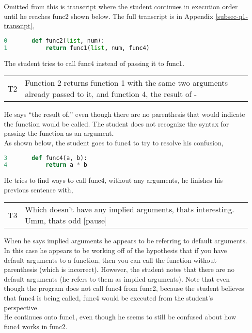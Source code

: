Omitted from this is transcript where the student continues in execution order until he reaches func2 shown below.
The full transcript is in Appendix \ref{subsec-q1-transcipt},

\begin{lstlisting}[language=python]
0		def func2(list, num):
1			return func1(list, num, func4)
\end{lstlisting}

The student tries to call func4 instead of passing it to func1.

\begin{tabular}{lp{13cm}}
T2&Function 2 returns function 1 with the same two arguments already passed to it, and function 4, the result of -\\
\end{tabular}

He says ``the result of,'' even though there are no parenthesis that would indicate the function would be called.
The student does not recognize the syntax for passing the function as an argument. \\

As shown below, the student goes to func4 to try to resolve his confusion,

\begin{lstlisting}[language=python]
3		def func4(a, b):
4			return a * b
\end{lstlisting}

He tries to find ways to call func4, without any arguments, he finishes his previous sentence with,

\begin{tabular}{lp{13cm}}
T3&Which doesn't have any implied arguments, thats interesting. Umm, thats odd [pause]\\
\end{tabular}

When he says implied arguments he appears to be referring to default arguments.
In this case he appears to be working off of the hypothesis that if you have default arguments to a function,
  then you can call the function without parenthesis (which is incorrect).
However, the student notes that there are no default arguments (he refers to them as implied arguments).
Note that even though the program does not call func4 from func2, because the student believes that func4 is being called, func4 would be executed from the student's perspective. \\

He continues onto func1, even though he seems to still be confused about how func4 works in func2.


